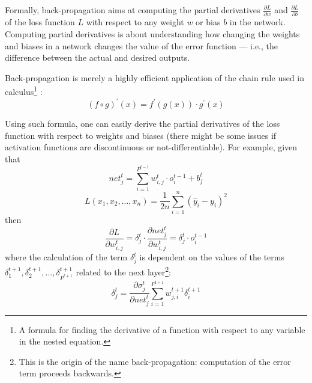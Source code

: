             Formally, back-propagation aims at computing the partial derivatives \(\frac{\partial L}{\partial w}\) and \(\frac{\partial L}{\partial b}\) of the loss function \(L\) with respect to any weight \(w\) or bias \(b\) in the network. Computing partial derivatives is about understanding how changing the weights and biases in a network changes the value of the error function --- i.e., the difference between the actual and desired outputs.
            
            Back-propagation is merely a highly efficient application of the chain rule used in calculus\footnote{A formula for finding the derivative of a function with respect to any variable in the nested equation.} \cite[205]{Goodfellow}:
            \[\left(f \circ g\right)^{\prime}\left(x\right) = f^{\prime}\left(g\left(x\right)\right) \cdot g^{\prime}\left(x\right)\]
            
            Using such formula, one can easily derive the partial derivatives of the loss function with respect to weights and biases (there might be some issues if activation functions are discontinuous or not-differentiable). For example, given that
            \[net_{j}^{t} = \sum_{i=1}^{P^{t-1}}w_{i,j}^{t} \cdot o_{i}^{t-1} + b_{j}^{t}\]
            \[L\left(x_1, x_2, \dots, x_n\right) = \frac{1}{2n}\sum_{i=1}^{n}\left(\hat{y}_i - y_{i}\right)^{2}\]
            then
            \[\frac{\partial L}{\partial w_{i,j}^{t}} = \delta_{j}^{t} \cdot \frac{\partial net_{j}^{t}}{\partial w_{i,j}^{t}} = \delta_{j}^{t} \cdot o_{i}^{t-1}\]
            where the calculation of the term \(\delta_{j}^{t}\) is dependent on the values of the terms \(\delta_{1}^{t+1}, \delta_{2}^{t+1}, \dots, \delta_{P^{t+1}}^{t+1}\) related to the next layer\footnote{This is the origin of the name back-propagation: computation of the error term proceeds backwards.}:
            \[\delta_{j}^{t} = \frac{\partial \sigma_j^t}{\partial net_j^t}\sum_{i=1}^{P^{t+1}}w_{j,i}^{t+1}\delta_{i}^{t+1}\]
